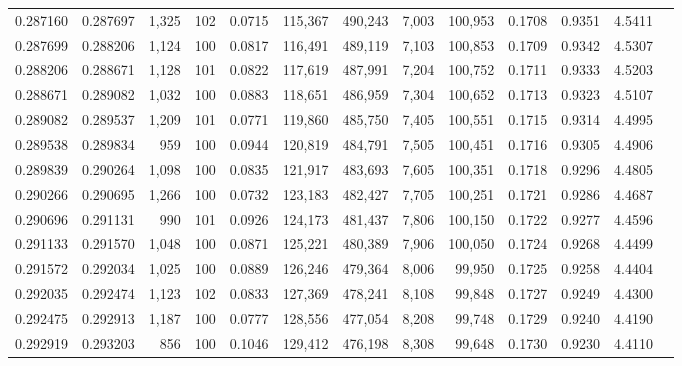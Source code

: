 \begin{tabular}{rrrrrrrrrrrrr}
0.287160 & 0.287697 & 1,325 & 102 &                                     0.0715 & 115,367 & 490,243 &   7,003 & 100,953 & 0.1708 & 0.9351 & 4.5411 \\
0.287699 & 0.288206 & 1,124 & 100 &                                     0.0817 & 116,491 & 489,119 &   7,103 & 100,853 & 0.1709 & 0.9342 & 4.5307 \\
0.288206 & 0.288671 & 1,128 & 101 &                                     0.0822 & 117,619 & 487,991 &   7,204 & 100,752 & 0.1711 & 0.9333 & 4.5203 \\
0.288671 & 0.289082 & 1,032 & 100 &                                     0.0883 & 118,651 & 486,959 &   7,304 & 100,652 & 0.1713 & 0.9323 & 4.5107 \\
0.289082 & 0.289537 & 1,209 & 101 &                                     0.0771 & 119,860 & 485,750 &   7,405 & 100,551 & 0.1715 & 0.9314 & 4.4995 \\
0.289538 & 0.289834 &   959 & 100 &                                     0.0944 & 120,819 & 484,791 &   7,505 & 100,451 & 0.1716 & 0.9305 & 4.4906 \\
0.289839 & 0.290264 & 1,098 & 100 &                                     0.0835 & 121,917 & 483,693 &   7,605 & 100,351 & 0.1718 & 0.9296 & 4.4805 \\
0.290266 & 0.290695 & 1,266 & 100 &                                     0.0732 & 123,183 & 482,427 &   7,705 & 100,251 & 0.1721 & 0.9286 & 4.4687 \\
0.290696 & 0.291131 &   990 & 101 &                                     0.0926 & 124,173 & 481,437 &   7,806 & 100,150 & 0.1722 & 0.9277 & 4.4596 \\
0.291133 & 0.291570 & 1,048 & 100 &                                     0.0871 & 125,221 & 480,389 &   7,906 & 100,050 & 0.1724 & 0.9268 & 4.4499 \\
0.291572 & 0.292034 & 1,025 & 100 &                                     0.0889 & 126,246 & 479,364 &   8,006 &  99,950 & 0.1725 & 0.9258 & 4.4404 \\
0.292035 & 0.292474 & 1,123 & 102 &                                     0.0833 & 127,369 & 478,241 &   8,108 &  99,848 & 0.1727 & 0.9249 & 4.4300 \\
0.292475 & 0.292913 & 1,187 & 100 &                                     0.0777 & 128,556 & 477,054 &   8,208 &  99,748 & 0.1729 & 0.9240 & 4.4190 \\
0.292919 & 0.293203 &   856 & 100 &                                     0.1046 & 129,412 & 476,198 &   8,308 &  99,648 & 0.1730 & 0.9230 & 4.4110 \\

\end{tabular}
